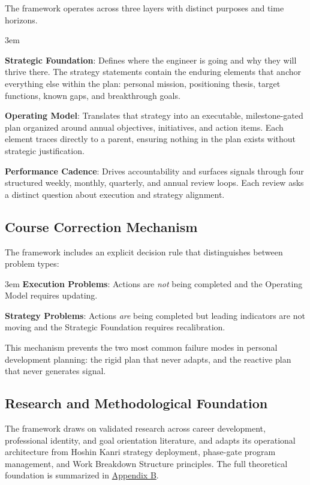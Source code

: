 \documentclass{article}
\begin{document}
The framework operates across three layers with distinct purposes and time horizons.
\begin{addmargin}[2em]{3em}

\textbf{Strategic Foundation}: Defines where the engineer is going and why they 
	will thrive there. The strategy statements contain the enduring elements that anchor 
	everything else within the plan: personal mission, positioning thesis, target functions, 
	known gaps, and breakthrough goals. 

\textbf{Operating Model}: Translates that strategy into an executable, milestone-gated plan organized 
	around annual objectives, initiatives, and action items. Each element traces directly to a parent,
	ensuring nothing in the plan exists without strategic justification. 

\textbf{Performance Cadence}: Drives accountability and surfaces signals through four structured weekly,
	monthly, quarterly, and annual review loops. Each review asks a distinct question about execution
	and strategy alignment.

\end{addmargin}

\newpage

\subsection{Course Correction Mechanism}

The framework includes an explicit decision rule that distinguishes between problem types:
\begin{addmargin}[2em]{3em}
	\textbf{Execution Problems}: Actions are \textit{not} being completed and the Operating Model requires updating.

	\textbf{Strategy Problems}: Actions \textit{are} being completed but leading indicators are not moving and the
	Strategic Foundation requires recalibration.
\end{addmargin}

This mechanism prevents the two most common failure modes in personal development planning: the rigid plan that 
never adapts, and the reactive plan that never generates signal.

\subsection{Research and Methodological Foundation}

The framework draws on validated research across career development,
professional identity, and goal orientation literature, and adapts its
operational architecture from Hoshin Kanri strategy deployment, phase-gate
program management, and Work Breakdown Structure principles. The full
theoretical foundation is summarized in \hyperref[AppendixB]{Appendix B}.
\end{document}
